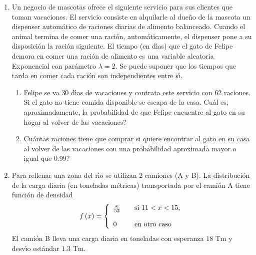 \documentclass[11pt,a4paper,twoside]{article}%
\begin{document}
\begin{enumerate}
\begin{enumerate}
\item salga \textquotedblleft6\textquotedblright\ entre 15 y 20 veces, inclusive.

\item la suma de los resultados obtenidos sea menor que 300.

\item el n\'{u}mero de veces que el resultado sea par est\'{e} entre 40 y 60
veces, inclusive.

\item el n\'{u}mero de veces que el resultado sea par sea mayor o igual que el
n\'{u}mero de veces que el resultado sea impar.
\end{enumerate}

\item Un negocio de mascotas ofrece el siguiente servicio para sus clientes
que toman vacaciones. El servicio consiste en alquilarle al due\~{n}o de la
mascota un dispenser autom\'{a}tico de raciones diarias de alimento
balanceado. Cuando el animal termina de comer una raci\'{o}n,
autom\'{a}ticamente, el dispenser pone a su disposici\'{o}n la raci\'{o}n
siguiente. El tiempo (en d\'{\i}as) que el gato de Felipe demora en comer una
raci\'{o}n de alimento es una variable aleatoria Exponencial con par\'{a}metro
$\lambda=2$. Se puede suponer que los tiempos que tarda en comer cada
raci\'{o}n son independientes entre s\'{\i}.

\begin{enumerate}
\item Felipe se va 30 d\'{\i}as de vacaciones y contrata este servicio con 62
raciones. Si el gato no tiene comida disponible se escapa de la casa.
\textquestiondown Cu\'{a}l es, aproximadamente, la probabilidad de que Felipe
encuentre al gato en su hogar al volver de las vacaciones?

\item \textquestiondown Cu\'{a}ntas raciones tiene que comprar si quiere
encontrar al gato en su casa al volver de las vacaciones con una probabilidad aproximada
mayor o igual que $0.99$?
\end{enumerate}


\item Para rellenar una zona del r\'{\i}o se utilizan 2 camiones (A y B). La
distribuci\'{o}n de la carga diaria (en toneladas m\'{e}tricas) transportada
por el cami\'{o}n A tiene funci\'{o}n de densidad
\[
f\left(  x\right)  =\left\{
\begin{array}
[c]{lll}%
\frac{x}{52} &  & \text{si }11<x<15,\\
&  & \\
0 &  & \text{en otro caso}%
\end{array}
\right.
\]
El cami\'{o}n B lleva una carga diaria en toneladas con esperanza $18$ Tm y
desv\'{\i}o est\'{a}ndar $1.3$ Tm.


\end{enumerate}
\end{document}
